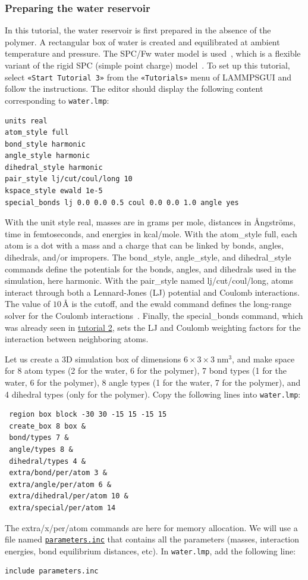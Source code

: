 \documentclass[9pt,tutorial]{livecoms}
\newcommand{\lmpcmd}[1]{\hspace{0pt}\colorbox{listing}{\textcolor{command}{\small{#1}}}\hspace{0pt}} %
\newcommand{\flecmd}[1]{\textcolor{command}{\texttt{#1}}} %
\newcommand{\guicmd}[1]{\textcolor{command}{\texttt{«#1»}}} %
\newcommand{\dwlcmd}[1]{\textcolor{download}{\texttt{#1}}} %
\newcommand{\lammpsgui}{\textsf{LAMMPS\textendash GUI}}
\newcommand{\filepath}{https://raw.githubusercontent.com/lammpstutorials/lammpstutorials-article/main/files/}
\begin{document}
\subsubsection{Preparing the water reservoir}

In this tutorial, the water reservoir is first prepared in the absence of the polymer.
A rectangular box of water is created and equilibrated at ambient temperature and
pressure.  The SPC/Fw water model is used~\cite{wu2006flexible}, which is
a flexible variant of the rigid SPC (simple point charge) model~\cite{berendsen1981interaction}.
To set up this tutorial, select \guicmd{Start Tutorial 3} from the
\guicmd{Tutorials} menu of \lammpsgui{} and follow the instructions.
The editor should display the following content corresponding to \flecmd{water.lmp}:
\begin{lstlisting}
units real
atom_style full
bond_style harmonic
angle_style harmonic
dihedral_style harmonic
pair_style lj/cut/coul/long 10
kspace_style ewald 1e-5
special_bonds lj 0.0 0.0 0.5 coul 0.0 0.0 1.0 angle yes
\end{lstlisting}
With the unit style \lmpcmd{real}, masses are in grams per mole, distances in
Ångströms, time in femtoseconds, and energies in kcal/mole.  With the \lmpcmd{atom\_style full},
each atom is a dot with a mass and a charge that can be linked by bonds, angles,
dihedrals, and/or impropers.  The \lmpcmd{bond\_style},
\lmpcmd{angle\_style}, and \lmpcmd{dihedral\_style} commands define the potentials
for the bonds, angles, and dihedrals used in the simulation, here \lmpcmd{harmonic}.
With the \lmpcmd{pair\_style} named \lmpcmd{lj/cut/coul/long}, atoms interact through
both a Lennard-Jones (LJ) potential and Coulomb interactions.  The value of $10\,\text{\AA{}}$ is the cutoff,
and the \lmpcmd{ewald} command defines the long-range solver for the Coulomb
interactions~\cite{ewald1921berechnung}.  Finally, the \lmpcmd{special\_bonds} command, which was already seen in
\hyperref[carbon-nanotube-label]{tutorial 2}, sets the LJ and Coulomb weighting
factors for the interaction between neighboring atoms.

Let us create a 3D simulation box of dimensions $6 \times 3 \times 3 \; \text{nm}^3$,
and make space for 8 atom types (2 for the water, 6 for the polymer), 7 bond types
(1 for the water, 6 for the polymer), 8 angle types (1 for the water, 7 for the polymer),
and 4 dihedral types (only for the polymer).  Copy the following lines into \flecmd{water.lmp}:
\begin{lstlisting}
 region box block -30 30 -15 15 -15 15
 create_box 8 box &
 bond/types 7 &
 angle/types 8 &
 dihedral/types 4 &
 extra/bond/per/atom 3 &
 extra/angle/per/atom 6 &
 extra/dihedral/per/atom 10 &
 extra/special/per/atom 14
\end{lstlisting}
The \lmpcmd{extra/x/per/atom} commands are here for
memory allocation.  We will use a file named
\href{\filepath tutorial3/parameters.inc}{\dwlcmd{parameters.inc}} that contains
all the parameters (masses, interaction energies, bond equilibrium
distances, etc).  In \flecmd{water.lmp}, add the following line:
\begin{lstlisting}
include parameters.inc
\end{lstlisting}
\end{document}
